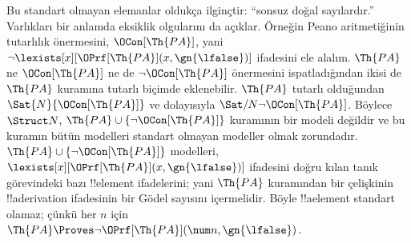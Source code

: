 \documentclass[../../../include/open-logic-section]{subfiles}
\begin{document}
Bu standart olmayan elemanlar oldukça ilginçtir: ``sonsuz doğal
sayılardır.'' Varlıkları bir anlamda eksiklik olgularını da açıklar.
Örneğin Peano aritmetiğinin tutarlılık önermesini,
$\OCon[\Th{PA}]$, yani
$\lnot\lexists[x][\OPrf[\Th{PA}](x,\gn{\lfalse})]$ ifadesini ele
alalım. $\Th{PA}$ ne $\OCon[\Th{PA}]$ ne de
$\lnot\OCon[\Th{PA}]$ önermesini ispatladığından ikisi de $\Th{PA}$
kuramına tutarlı biçimde eklenebilir. $\Th{PA}$ tutarlı olduğundan
$\Sat{N}{\OCon[\Th{PA}]}$ ve dolayısıyla
$\Sat/{N}{\lnot\OCon[\Th{PA}]}$. Böylece $\Struct N$,
$\Th{PA}\cup\{\lnot\OCon[\Th{PA}]\}$ kuramının bir modeli değildir
ve bu kuramın bütün modelleri standart olmayan modeller olmak
zorundadır. $\Th{PA}\cup\{\lnot\OCon[\Th{PA}]\}$ modelleri,
$\lexists[x][\OPrf[\Th{PA}](x,\gn{\lfalse})]$ ifadesini doğru kılan
tanık görevindeki bazı !!{element} ifadelerini; yani $\Th{PA}$
kuramından bir çelişkinin !!a{derivation} ifadesinin bir Gödel sayısını
içermelidir. Böyle !!a{element} standart olamaz; çünkü her $n$ için
$\Th{PA}\Proves\lnot\OPrf[\Th{PA}](\num n,\gn{\lfalse})$.
\end{document}
